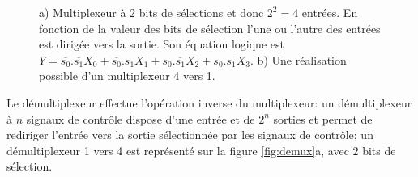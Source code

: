 \begin{figure}[htbp]
\begin{minipage}[c]{.46\linewidth}
   \end{minipage}
\caption{\label{fig:mux} a) Multiplexeur à 2 bits de sélections et donc $2^2 = 4$ entrées. En fonction de la valeur des bits de sélection l'une ou l'autre des entrées est dirigée vers la sortie. Son équation logique est $Y = \overline{s_0}.\overline{s_1}X_0 + \overline{s_0}.s_1 X_1 + s_0.\overline{s_1}X_2 + s_0.s_1 X_3$. b) Une réalisation possible d'un multiplexeur 4 vers 1.}
\end{figure}

Le démultiplexeur effectue l'opération inverse du multiplexeur: un démultiplexeur à $n$ signaux de contrôle dispose d'une entrée et de $2^n$ sorties et permet de rediriger l'entrée vers la sortie sélectionnée par les signaux de contrôle; un démultiplexeur 1 vers 4 est représenté sur la figure \ref{fig:demux}a, avec $2$ bits de sélection.

